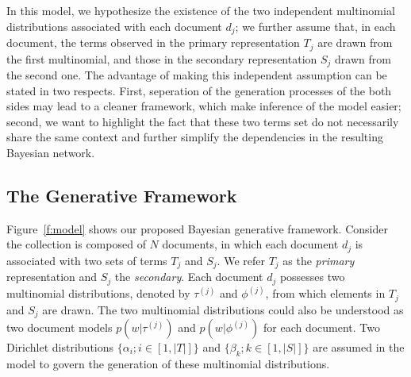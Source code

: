 In this model, we hypothesize the existence of the two independent multinomial
distributions associated with each document $d_j$; we further assume that, in
each document, the terms observed in the primary representation $T_j$ are drawn
from the first multinomial, and those in the secondary representation $S_j$
drawn from the second one.  The advantage of making this independent assumption
can be stated in two respects.  First, seperation of the generation processes
of the both sides may lead to a cleaner framework, which make inference of the
model easier; second, we want to highlight the fact that these two terms
set do not necessarily share the same context and further simplify the
dependencies in the resulting Bayesian network.  

\subsection{The Generative Framework}

Figure~\ref{f:model} shows our proposed Bayesian generative framework.
Consider the collection is composed of $N$ documents, in which each document
$d_j$ is associated with two sets of terms $T_j$ and $S_j$.  We refer $T_j$ as
the \emph{primary} representation and $S_j$ the \emph{secondary}.  Each
document $d_j$ possesses two multinomial distributions, denoted by $\tau^{(j)}$
and $\phi^{(j)}$, from which elements in $T_j$ and $S_j$ are drawn.  The two
multinomial distributions could also be understood as two document models
$p(w|\tau^{(j)})$ and $p(w|\phi^{(j)})$ for each document.  Two Dirichlet
distributions $\{\alpha_i; i \in [1, |T|]\}$ and $\{\beta_k; k \in [1, |S|]\}$
are assumed in the model to govern the generation of these multinomial
distributions.  

